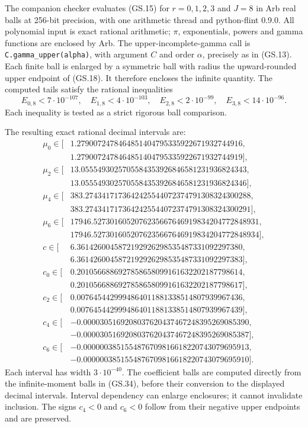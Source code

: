 The companion checker evaluates (GS.15) for $r=0,1,2,3$ and
$J=8$ in Arb real balls at 256-bit precision, with one arithmetic
thread and python-flint 0.9.0. All polynomial input is exact
rational arithmetic; $\pi$, exponentials, powers and gamma functions
are enclosed by Arb. The upper-incomplete-gamma call is
\texttt{C.gamma\_upper(alpha)}, with argument $C$ and order
$\alpha$, precisely as in (GS.13). Each finite ball is enlarged
by a symmetric ball with radius the upward-rounded upper endpoint
of (GS.18). It therefore encloses the infinite quantity.
The computed tails satisfy the rational inequalities
\begin{equation}
 E_{0,8}<7\cdot10^{-107},\quad E_{1,8}<4\cdot10^{-103},\quad
 E_{2,8}<2\cdot10^{-99},\quad E_{3,8}<14\cdot10^{-96}.
 \tag{GS.36}
\end{equation}
Each inequality is tested as a strict rigorous ball comparison.

The resulting exact rational decimal intervals are:
\begin{align*}
 \mu_0\in[&1.2790072478464851404795335922671932744916,\\[-2pt]
           &1.2790072478464851404795335922671932744919],\\
 \mu_2\in[&13.0555493025705584353926846581231936824343,\\[-2pt]
           &13.0555493025705584353926846581231936824346],\\
 \mu_4\in[&383.2743417173642425544072374791308324300288,\\[-2pt]
           &383.2743417173642425544072374791308324300291],\\
 \mu_6\in[&17946.5273016052076235667646919834204772848931,\\[-2pt]
           &17946.5273016052076235667646919834204772848934],\\
 c\in[&6.3614260045872192926298535487331092297380,\\[-2pt]
       &6.3614260045872192926298535487331092297383],\\
 c_0\in[&0.2010566886927858658099161632202187798614,\\[-2pt]
         &0.2010566886927858658099161632202187798617],\\
 c_2\in[&0.0076454429994864011881338514807939967436,\\[-2pt]
         &0.0076454429994864011881338514807939967439],\\
 c_4\in[&-0.0000305169208037620437467248395269085390,\\[-2pt]
         &-0.0000305169208037620437467248395269085387],\\
 c_6\in[&-0.0000003851554876709816618220743079695913,\\[-2pt]
         &-0.0000003851554876709816618220743079695910].
\end{align*}
Each interval has width $3\cdot10^{-40}$. The coefficient balls
are computed directly from the infinite-moment balls in (GS.34),
before their conversion to the displayed decimal intervals. Interval
dependency can enlarge enclosures; it cannot invalidate inclusion.
The signs $c_4<0$ and $c_6<0$ follow from their negative upper
endpoints and are preserved.

